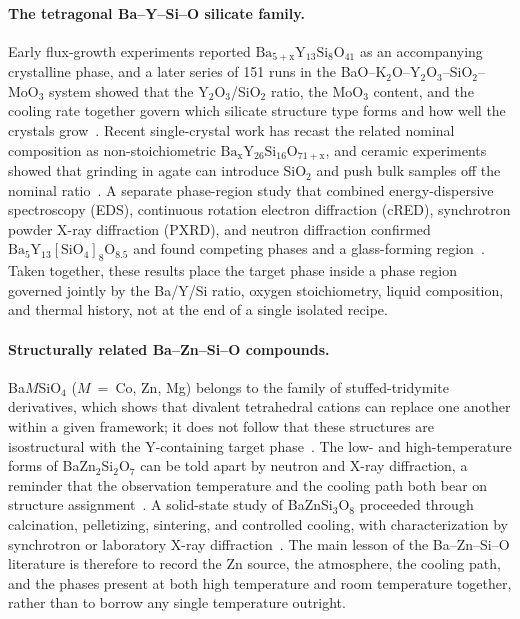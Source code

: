 \paragraph{The tetragonal Ba--Y--Si--O silicate family.}
Early flux-growth experiments reported $\mathrm{Ba_{5+x}Y_{13}Si_8O_{41}}$ as an accompanying crystalline phase, and a later series of 151 runs in the BaO--K$_2$O--Y$_2$O$_3$--SiO$_2$--MoO$_3$ system showed that the Y$_2$O$_3$\slash SiO$_2$ ratio, the MoO$_3$ content, and the cooling rate together govern which silicate structure type forms and how well the crystals grow~\cite{kolitsch2009crystal,wierzbickawieczorek2017high}. Recent single-crystal work has recast the related nominal composition as non-stoichiometric $\mathrm{Ba_xY_{26}Si_{16}O_{71+x}}$, and ceramic experiments showed that grinding in agate can introduce SiO$_2$ and push bulk samples off the nominal ratio~\cite{yamane2024synthesis,yamane2024microstructure}. A separate phase-region study that combined energy-dispersive spectroscopy (EDS), continuous rotation electron diffraction (cRED), synchrotron powder X-ray diffraction (PXRD), and neutron diffraction confirmed $\mathrm{Ba_5Y_{13}[SiO_4]_8O_{8.5}}$ and found competing phases and a glass-forming region~\cite{gulay2024navigation}. Taken together, these results place the target phase inside a phase region governed jointly by the Ba\slash Y\slash Si ratio, oxygen stoichiometry, liquid composition, and thermal history, not at the end of a single isolated recipe.

\paragraph{Structurally related Ba--Zn--Si--O compounds.}
Ba$M$SiO$_4$ ($M$~=~Co, Zn, Mg) belongs to the family of stuffed-tridymite derivatives, which shows that divalent tetrahedral cations can replace one another within a given framework; it does not follow that these structures are isostructural with the Y-containing target phase~\cite{liu1993structures}. The low- and high-temperature forms of BaZn$_2$Si$_2$O$_7$ can be told apart by neutron and X-ray diffraction, a reminder that the observation temperature and the cooling path both bear on structure assignment~\cite{lin1999phase}. A solid-state study of BaZnSi$_3$O$_8$ proceeded through calcination, pelletizing, sintering, and controlled cooling, with characterization by synchrotron or laboratory X-ray diffraction~\cite{zou2021crystal}. The main lesson of the Ba--Zn--Si--O literature is therefore to record the Zn source, the atmosphere, the cooling path, and the phases present at both high temperature and room temperature together, rather than to borrow any single temperature outright.

